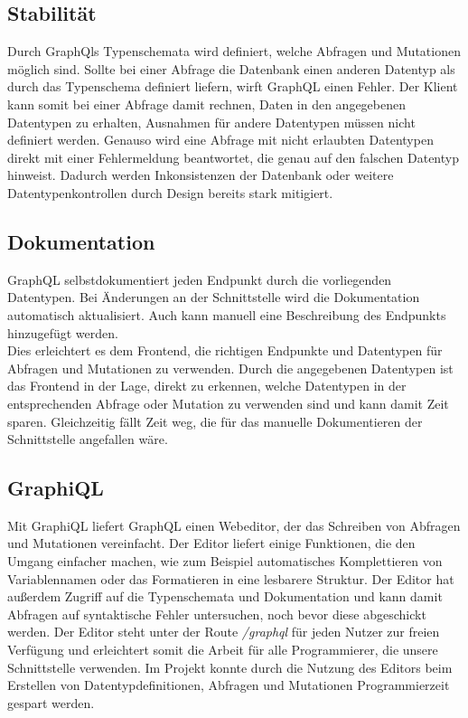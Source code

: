 \subsection{Stabilität}
Durch GraphQls Typenschemata wird definiert, welche Abfragen und Mutationen möglich sind.
Sollte bei einer Abfrage die Datenbank einen anderen Datentyp als durch das Typenschema definiert liefern, wirft GraphQL einen Fehler.
Der Klient kann somit bei einer Abfrage damit rechnen, Daten in den angegebenen Datentypen zu erhalten, Ausnahmen für andere Datentypen müssen nicht definiert werden.
Genauso wird eine Abfrage mit nicht erlaubten Datentypen direkt mit einer Fehlermeldung beantwortet, die genau auf den falschen Datentyp hinweist.
Dadurch werden Inkonsistenzen der Datenbank oder weitere Datentypenkontrollen durch Design bereits stark mitigiert.

\subsection{Dokumentation}
GraphQL selbstdokumentiert jeden Endpunkt durch die vorliegenden Datentypen.
Bei Änderungen an der Schnittstelle wird die Dokumentation automatisch aktualisiert. Auch kann manuell eine Beschreibung des Endpunkts hinzugefügt werden. \\
Dies erleichtert es dem Frontend, die richtigen Endpunkte und Datentypen für Abfragen und Mutationen zu verwenden.
Durch die angegebenen Datentypen ist das Frontend in der Lage, direkt zu erkennen, welche Datentypen in der entsprechenden Abfrage oder Mutation zu verwenden sind und kann damit Zeit sparen.
Gleichzeitig fällt Zeit weg, die für das manuelle Dokumentieren der Schnittstelle angefallen wäre.

\subsection{GraphiQL}
Mit GraphiQL liefert GraphQL einen Webeditor, der das Schreiben von Abfragen und Mutationen vereinfacht.
Der Editor liefert einige Funktionen, die den Umgang einfacher machen, wie zum Beispiel automatisches Komplettieren von Variablennamen oder das Formatieren in eine lesbarere Struktur.
Der Editor hat außerdem Zugriff auf die Typenschemata und Dokumentation und kann damit Abfragen auf syntaktische Fehler untersuchen, noch bevor diese abgeschickt werden.
Der Editor steht unter der Route \textit{/graphql} für jeden Nutzer zur freien Verfügung und erleichtert somit die Arbeit für alle Programmierer, die unsere Schnittstelle verwenden.
Im Projekt konnte durch die Nutzung des Editors beim Erstellen von Datentypdefinitionen, Abfragen und Mutationen Programmierzeit gespart werden.

